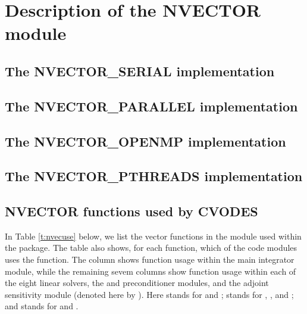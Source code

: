 \chapter{Description of the NVECTOR module}\label{s:nvector}


\section{The NVECTOR\_SERIAL implementation}\label{ss:nvec_ser}


\section{The NVECTOR\_PARALLEL implementation}\label{ss:nvec_par}


\section{The NVECTOR\_OPENMP implementation}\label{ss:nvec_openmp}


\section{The NVECTOR\_PTHREADS implementation}\label{ss:nvec_pthreads}


\section{NVECTOR functions used by CVODES}

In Table \ref{t:nvecuse} below, we list the vector functions in the 
{\nvector} module used within the {\cvodes} package.
The table also shows, for each function, which of the code modules uses
the function. The {\cvodes} column shows function usage within the main
integrator module, while the remaining sevem columns show function usage
within each of the eight {\cvodes} linear solvers, the {\cvbandpre} and
{\cvbbdpre} preconditioner modules, and the {\cvodes} adjoint sensitivity
module (denoted here by {\cvodea}).  Here {\cvdls} stands for {\cvdense} and
{\cvband}; {\cvspils} stands for {\cvspgmr}, {\cvspbcg}, and {\cvsptfqmr};
and {\cvsls} stands for {\cvklu} and {\cvsuperlumt}.

